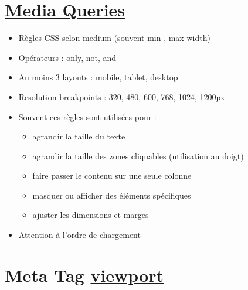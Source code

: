\hypertarget{media-queries7-1}{%
\section{\texorpdfstring{\href{https://developer.mozilla.org/fr/docs/CSS/Media_queries}{Media
Queries}}{Media Queries}}\label{media-queries7-1}}

\begin{english}

\begin{Shaded}
\begin{Highlighting}[]
\end{Highlighting}
\end{Shaded}

\end{english}

\begin{itemize}
\tightlist
\item
  Règles CSS selon medium (souvent min-, max-width)
\item
  Opérateurs : only, not, and
\item
  Au moins 3 layouts : mobile, tablet, desktop
\item
  Resolution breakpoints : 320, 480, 600, 768, 1024, 1200px
\item
  Souvent ces règles sont utilisées pour :

  \begin{itemize}
  \tightlist
  \item
    agrandir la taille du texte
  \item
    agrandir la taille des zones cliquables (utilisation au doigt)
  \item
    faire passer le contenu sur une seule colonne
  \item
    masquer ou afficher des éléments spécifiques
  \item
    ajuster les dimensions et marges
  \end{itemize}
\item
  Attention à l'ordre de chargement
\end{itemize}

\hypertarget{meta-tag-viewport8}{%
\section{\texorpdfstring{Meta Tag
\href{http://blog.javierusobiaga.com/stop-using-the-viewport-tag-until-you-know-ho}{viewport}}{Meta Tag viewport}}\label{meta-tag-viewport8}}

